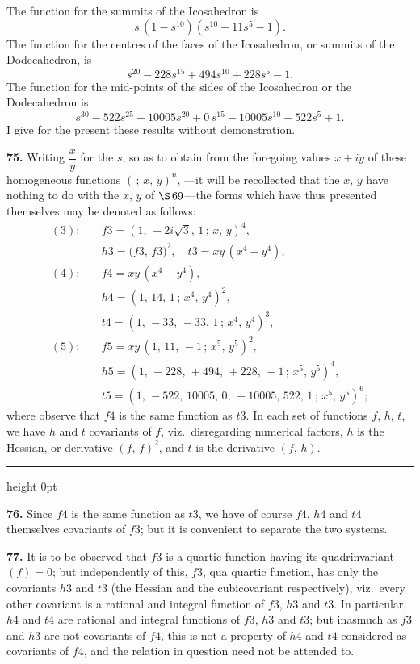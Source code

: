 \documentclass[11pt,a4paper]{article}
\newcommand{\artno}[1]{\textbf{#1.}\quad}
\begin{document}
The function for the summits of the Icosahedron is
\[
  s\,(1 - s^{10})(s^{10} + 11 s^{5} - 1).
\]
The function for the centres of the faces of the Icosahedron, or summits of
the Dodecahedron, is
\[
  s^{20} - 228 s^{15} + 494 s^{10} + 228 s^{5} - 1.
\]
The function for the mid-points of the sides of the Icosahedron or the
Dodecahedron is
\[
  s^{30} - 522 s^{25} + 10005 s^{20} + 0\,s^{15} - 10005 s^{10}
   + 522 s^{5} + 1.
\]
I give for the present these results without demonstration.

\artno{75} Writing $\dfrac{x}{y}$ for the $s$, so as to obtain from the
foregoing values $x + iy$ of these homogeneous functions $(\,;\,x,\,y)^{n}$,
---it will be recollected that the $x$, $y$ have nothing to do with the $x$,
$y$ of $\S\,69$---the forms which have thus presented themselves may be
denoted as follows:
\begin{align*}
(3):\quad & f3 = (1,\,-2i\sqrt{3},\,1\,;\,x,\,y)^{4},\\
          & h3 = \bigl(f3,\,f3\bigr)^{2},\quad t3 = x y\,(x^{4} - y^{4}),\\[2pt]
(4):\quad & f4 = xy\,(x^{4} - y^{4}),\\
          & h4 = (1,\,14,\,1\,;\,x^{4},\,y^{4})^{2},\\
          & t4 = (1,\,-33,\,-33,\,1\,;\,x^{4},\,y^{4})^{3},\\[2pt]
(5):\quad & f5 = xy\,(1,\,11,\,-1\,;\,x^{5},\,y^{5})^{2},\\
          & h5 = (1,\,-228,\,+494,\,+228,\,-1\,;\,x^{5},\,y^{5})^{4},\\
          & t5 = (1,\,-522,\,10005,\,0,\,-10005,\,522,\,1\,;\,x^{5},\,y^{5})^{6};
\end{align*}
where observe that $f4$ is the same function as $t3$. In each set of
functions $f$, $h$, $t$, we have $h$ and $t$ covariants of $f$, viz.\
disregarding numerical factors, $h$ is the Hessian, or derivative
$(f,\,f)^{2}$, and $t$ is the derivative $(f,\,h)$.

\bigskip
\hrule height 0pt
\bigskip

\artno{76} Since $f4$ is the same function as $t3$, we have of course $f4$,
$h4$ and $t4$ themselves covariants of $f3$; but it is convenient to
separate the two systems.

\artno{77} It is to be observed that $f3$ is a quartic function having its
quadrinvariant $(f) = 0$; but independently of this, $f3$, qua quartic
function, has only the covariants $h3$ and $t3$ (the Hessian and the
cubicovariant respectively), viz.\ every other covariant is a rational and
integral function of $f3$, $h3$ and $t3$. In particular, $h4$ and $t4$ are
rational and integral functions of $f3$, $h3$ and $t3$; but inasmuch as $f3$
and $h3$ are not covariants of $f4$, this is not a property of $h4$ and $t4$
considered as covariants of $f4$, and the relation in question need not be
attended to.
\end{document}
